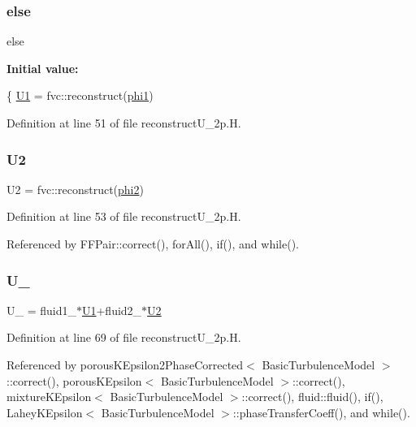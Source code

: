 \subsubsection{\texorpdfstring{else}{else}}
{\footnotesize\ttfamily else}

{\bfseries Initial value\+:}
\begin{DoxyCode}
\{
    \hyperlink{EEqns__2p_8H_aaab6b554a159f5b9398870162ee1b75a}{U1} = fvc::reconstruct(\hyperlink{solveAlphaMULES_8H_a56f7cc5336f24e776556c927f6a53a15}{phi1})
\end{DoxyCode}


Definition at line 51 of file reconstruct\+U\+\_\+2p.\+H.

\mbox{\label{reconstructU__2p_8H_a9415ac9cefca559abb91219426b7250b}} 
\subsubsection{\texorpdfstring{U2}{U2}}
{\footnotesize\ttfamily U2 = fvc\+::reconstruct(\hyperlink{refsAndControls__2p_8H_adb57687d5d74249f550cb14883eebe4d}{phi2})}



Definition at line 53 of file reconstruct\+U\+\_\+2p.\+H.



Referenced by F\+F\+Pair\+::correct(), for\+All(), if(), and while().

\mbox{\label{reconstructU__2p_8H_a12e26642a08fb9a2f5c78dbf346aa511}} 
\subsubsection{\texorpdfstring{U\+\_\+}{U\_}}
{\footnotesize\ttfamily U\+\_\+ = fluid1\+\_\+$\ast$\hyperlink{UEqns__2p_8H_a36d208f2338b1dd1ec90b2b1333d5f42}{U1}+fluid2\+\_\+$\ast$\hyperlink{UEqns__2p_8H_af55bc79119bfe60c39e86c5ddf988e7a}{U2}}



Definition at line 69 of file reconstruct\+U\+\_\+2p.\+H.



Referenced by porous\+K\+Epsilon2\+Phase\+Corrected$<$ Basic\+Turbulence\+Model $>$\+::correct(), porous\+K\+Epsilon$<$ Basic\+Turbulence\+Model $>$\+::correct(), mixture\+K\+Epsilon$<$ Basic\+Turbulence\+Model $>$\+::correct(), fluid\+::fluid(), if(), Lahey\+K\+Epsilon$<$ Basic\+Turbulence\+Model $>$\+::phase\+Transfer\+Coeff(), and while().

